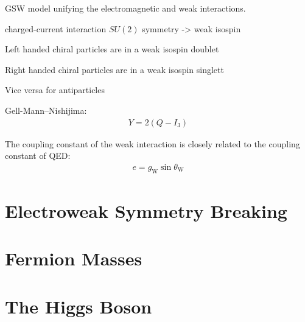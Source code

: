 GSW model unifying the electromagnetic and weak interactions.



charged-current interaction $SU(2)$ symmetry -> weak isospin

Left handed chiral particles are in a weak isospin doublet

Right handed chiral particles are in a weak isospin singlett

Vice versa for antiparticles


Gell-Mann--Nishijima:
\begin{align*}
  Y = 2 (Q  - I_3)
\end{align*}





The coupling constant of the weak interaction is closely related to the coupling
constant of QED:
\begin{align*}
  e = g_{\text{W}} \sin\theta_{\text{W}}
\end{align*}

\section{Electroweak Symmetry Breaking}

\section{Fermion Masses}

\section{The Higgs Boson}


\clearpage


